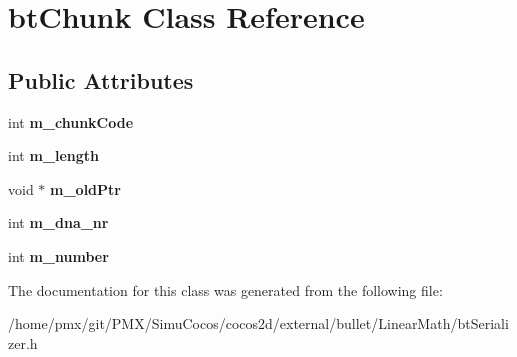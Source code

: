 \hypertarget{classbtChunk}{}\section{bt\+Chunk Class Reference}
\label{classbtChunk}
\subsection*{Public Attributes}
\begin{DoxyCompactItemize}
\item 
\mbox{\label{classbtChunk_a9d6db015694b37fad18bf7e4c0bc95fb}} 
int {\bfseries m\+\_\+chunk\+Code}
\item 
\mbox{\label{classbtChunk_a8d09379c186e19d599a3a9bbe2a71c67}} 
int {\bfseries m\+\_\+length}
\item 
\mbox{\label{classbtChunk_abc3335a5c2f757741a4935e37b71f347}} 
void $\ast$ {\bfseries m\+\_\+old\+Ptr}
\item 
\mbox{\label{classbtChunk_abcbb7c1bc0db7f13c4073707dba451bb}} 
int {\bfseries m\+\_\+dna\+\_\+nr}
\item 
\mbox{\label{classbtChunk_a32e09b132faa88daeab92d290720cc12}} 
int {\bfseries m\+\_\+number}
\end{DoxyCompactItemize}


The documentation for this class was generated from the following file\+:\begin{DoxyCompactItemize}
\item 
/home/pmx/git/\+P\+M\+X/\+Simu\+Cocos/cocos2d/external/bullet/\+Linear\+Math/bt\+Serializer.\+h\end{DoxyCompactItemize}
